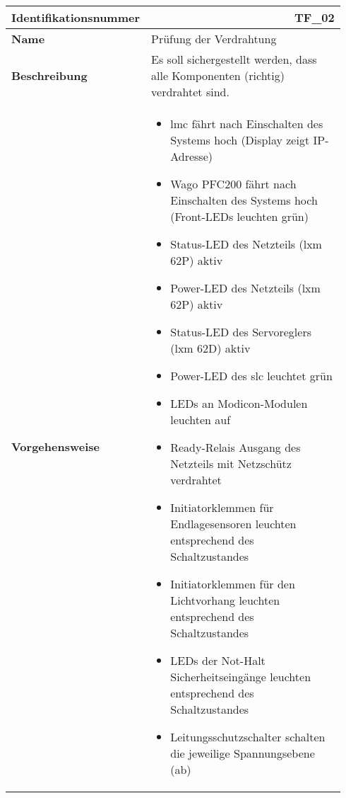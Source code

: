 \documentclass[../../../Bachelorarbeit.tex]{subfiles}
\begin{document}
\begin{table}[H]
    \centering
    \begin{tabular}{ p{0.34\linewidth}  p{0.6\linewidth} }
        \hline
        \textbf{Identifikationsnummer}  & \multicolumn{1}{r}{TF\_02} \\ \hline
        \textbf{Name}                   & Prüfung der Verdrahtung \\
        \textbf{Beschreibung}           & Es soll sichergestellt werden, dass alle Komponenten (richtig) verdrahtet sind. \\
        \textbf{Vorgehensweise}         &   {\begin{itemize}[noitemsep,topsep=0pt,parsep=0pt,partopsep=0pt,leftmargin=*]
                                                \item \acs{lmc} fährt nach Einschalten des Systems hoch (Display zeigt IP-Adresse)
                                                \item Wago PFC200 fährt nach Einschalten des Systems hoch (Front-LEDs leuchten grün)
                                                \item Status-LED des Netzteils (\acs{lxm} 62P) aktiv
                                                \item Power-LED des Netzteils (\acs{lxm} 62P) aktiv
                                                \item Status-LED des Servoreglers (\acs{lxm} 62D) aktiv
                                                \item Power-LED des \acs{slc} leuchtet grün
                                                \item LEDs an Modicon-Modulen leuchten auf
                                                \item Ready-Relais Ausgang des Netzteils mit Netzschütz verdrahtet
                                                \item Initiatorklemmen für Endlagesensoren leuchten entsprechend des Schaltzustandes
                                                \item Initiatorklemmen für den Lichtvorhang leuchten entsprechend des Schaltzustandes
                                                \item LEDs der Not-Halt Sicherheitseingänge leuchten entsprechend des Schaltzustandes
                                                \item Leitungsschutzschalter schalten die jeweilige Spannungsebene (ab)

\end{itemize}}
\end{tabular}
\end{table}
\end{document}
